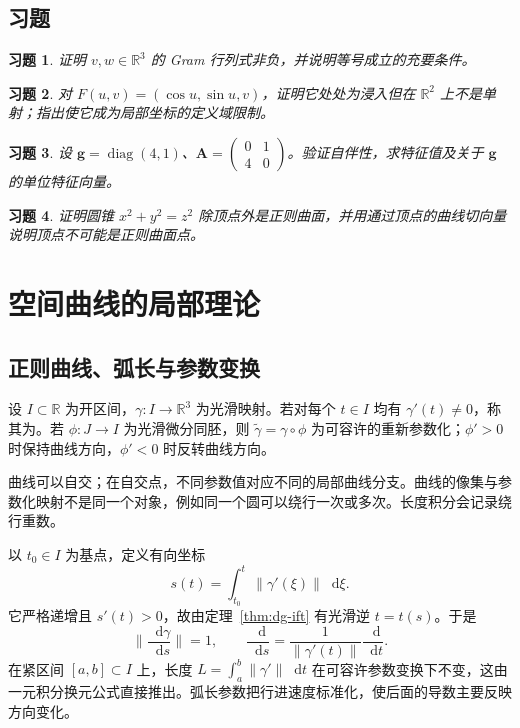 \documentclass[UTF8,12pt,a4paper,fontset=fandol]{ctexbook}
\newcommand{\R}{\mathbb R}
\newcommand{\dd}{\mathop{}\!\mathrm d}
\newcommand{\norm}[1]{\lVert #1\rVert}
\newtheorem{exercise}{习题}[chapter]
\begin{document}
\section{习题}
\begin{exercise}\label{ex:dg-tools-gram}
证明 $v,w\in\R^3$ 的 Gram 行列式非负，并说明等号成立的充要条件。
\end{exercise}
\begin{exercise}\label{ex:dg-tools-immersion}
对 $F(u,v)=(\cos u,\sin u,v)$，证明它处处为浸入但在 $\R^2$ 上不是单射；指出使它成为局部坐标的定义域限制。
\end{exercise}
\begin{exercise}\label{ex:dg-tools-selfadjoint}
设 $\mathbf g=\operatorname{diag}(4,1)$、$\mathbf A=\begin{pmatrix}0&1\\4&0\end{pmatrix}$。验证自伴性，求特征值及关于 $\mathbf g$ 的单位特征向量。
\end{exercise}
\begin{exercise}\label{ex:dg-tools-cone}
证明圆锥 $x^2+y^2=z^2$ 除顶点外是正则曲面，并用通过顶点的曲线切向量说明顶点不可能是正则曲面点。
\end{exercise}

\chapter{空间曲线的局部理论}
\label{chap:dg-curves}

\section{正则曲线、弧长与参数变换}
\begin{definition}[正则参数曲线]
设 $I\subset\R$ 为开区间，$\gamma:I\to\R^3$ 为光滑映射。若对每个 $t\in I$ 均有 $\gamma'(t)\ne0$，称其为。若 $\phi:J\to I$ 为光滑微分同胚，则 $\widetilde\gamma=\gamma\circ\phi$ 为可容许的重新参数化；$\phi'>0$ 时保持曲线方向，$\phi'<0$ 时反转曲线方向。
\end{definition}
曲线可以自交；在自交点，不同参数值对应不同的局部曲线分支。曲线的像集与参数化映射不是同一个对象，例如同一个圆可以绕行一次或多次。长度积分会记录绕行重数。

以 $t_0\in I$ 为基点，定义有向坐标
\[
 s(t)=\int_{t_0}^t\norm{\gamma'(\xi)}\dd\xi.
\]
它严格递增且 $s'(t)>0$，故由定理~\ref{thm:dg-ift} 有光滑逆 $t=t(s)$。于是
\begin{equation}
 \norm{\frac{\dd\gamma}{\dd s}}=1,
 \qquad \frac{\dd}{\dd s}=\frac1{\norm{\gamma'(t)}}\frac{\dd}{\dd t}.
 \label{eq:dg-arclength}
\end{equation}
在紧区间 $[a,b]\subset I$ 上，长度 $L=\int_a^b\norm{\gamma'}\dd t$ 在可容许参数变换下不变，这由一元积分换元公式直接推出。弧长参数把行进速度标准化，使后面的导数主要反映方向变化。
\end{document}
